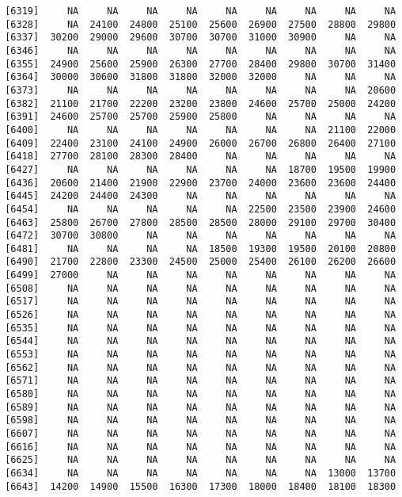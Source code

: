 \documentclass[]{article}
\begin{document}
\begin{verbatim}
 [6319]     NA     NA     NA     NA     NA     NA     NA     NA     NA
 [6328]     NA  24100  24800  25100  25600  26900  27500  28800  29800
 [6337]  30200  29000  29600  30700  30700  31000  30900     NA     NA
 [6346]     NA     NA     NA     NA     NA     NA     NA     NA     NA
 [6355]  24900  25600  25900  26300  27700  28400  29800  30700  31400
 [6364]  30000  30600  31800  31800  32000  32000     NA     NA     NA
 [6373]     NA     NA     NA     NA     NA     NA     NA     NA  20600
 [6382]  21100  21700  22200  23200  23800  24600  25700  25000  24200
 [6391]  24600  25700  25700  25900  25800     NA     NA     NA     NA
 [6400]     NA     NA     NA     NA     NA     NA     NA  21100  22000
 [6409]  22400  23100  24100  24900  26000  26700  26800  26400  27100
 [6418]  27700  28100  28300  28400     NA     NA     NA     NA     NA
 [6427]     NA     NA     NA     NA     NA     NA  18700  19500  19900
 [6436]  20600  21400  21900  22900  23700  24000  23600  23600  24400
 [6445]  24200  24400  24300     NA     NA     NA     NA     NA     NA
 [6454]     NA     NA     NA     NA     NA  22500  23500  23900  24600
 [6463]  25800  26700  27800  28500  28500  28000  29100  29700  30400
 [6472]  30700  30800     NA     NA     NA     NA     NA     NA     NA
 [6481]     NA     NA     NA     NA  18500  19300  19500  20100  20800
 [6490]  21700  22800  23300  24500  25000  25400  26100  26200  26600
 [6499]  27000     NA     NA     NA     NA     NA     NA     NA     NA
 [6508]     NA     NA     NA     NA     NA     NA     NA     NA     NA
 [6517]     NA     NA     NA     NA     NA     NA     NA     NA     NA
 [6526]     NA     NA     NA     NA     NA     NA     NA     NA     NA
 [6535]     NA     NA     NA     NA     NA     NA     NA     NA     NA
 [6544]     NA     NA     NA     NA     NA     NA     NA     NA     NA
 [6553]     NA     NA     NA     NA     NA     NA     NA     NA     NA
 [6562]     NA     NA     NA     NA     NA     NA     NA     NA     NA
 [6571]     NA     NA     NA     NA     NA     NA     NA     NA     NA
 [6580]     NA     NA     NA     NA     NA     NA     NA     NA     NA
 [6589]     NA     NA     NA     NA     NA     NA     NA     NA     NA
 [6598]     NA     NA     NA     NA     NA     NA     NA     NA     NA
 [6607]     NA     NA     NA     NA     NA     NA     NA     NA     NA
 [6616]     NA     NA     NA     NA     NA     NA     NA     NA     NA
 [6625]     NA     NA     NA     NA     NA     NA     NA     NA     NA
 [6634]     NA     NA     NA     NA     NA     NA     NA  13000  13700
 [6643]  14200  14900  15500  16300  17300  18000  18400  18100  18300

\end{verbatim}
\end{document}
